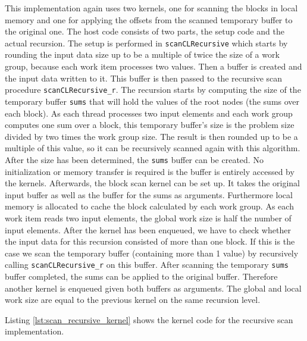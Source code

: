 This implementation again uses two kernels, one for scanning the blocks in local memory and one for applying the offsets from the scanned temporary buffer to the original one. The host code consists of two parts, the setup code and the actual recursion. The setup is performed in \lstinline!scanCLRecursive! which starts by rounding the input data size up to be a multiple of twice the size of a work group, because each work item processes two values. Then a buffer is created and the input data written to it. This buffer is then passed to the recursive scan procedure \lstinline!scanCLRecursive_r!. The recursion starts by computing the size of the temporary buffer \lstinline!sums! that will hold the values of the root nodes (the sums over each block). As each thread processes two input elements and each work group computes one sum over a block, this temporary buffer's size is the problem size divided by two times the work group size. The result is then rounded up to be a multiple of this value, so it can be recursively scanned again with this algorithm. After the size has been determined, the \lstinline!sums! buffer can be created. No initialization or memory transfer is required is the buffer is entirely accessed by the kernels. Afterwards, the block scan kernel can be set up. It takes the original input buffer as well as the buffer for the sums as arguments. Furthermore local memory is allocated to cache the block calculated by each work group. As each work item reads two input elements, the global work size is half the number of input elements. After the kernel has been enqueued, we have to check whether the input data for this recursion consisted of more than one block. If this is the case we scan the temporary buffer (containing more than 1 value) by recursively calling \lstinline!scanCLRecursive_r! on this buffer. After scanning the temporary \lstinline!sums! buffer completed, the sums can be applied to the original buffer. Therefore another kernel is enqueued given both buffers as arguments. The global and local work size are equal to the previous kernel on the same recursion level.
 
Listing \ref{lst:scan_recursive_kernel} shows the kernel code for the recursive scan implementation.



